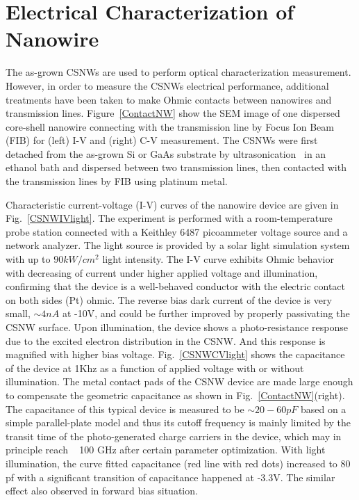 \section{Electrical Characterization of Nanowire}

The as-grown CSNWs are used to perform optical characterization measurement.
However, in order to measure the CSNWs electrical performance, additional
treatments have been taken to make Ohmic contacts between nanowires and
transmission lines. Figure~\ref{ContactNW} show the SEM image of one dispersed
core-shell nanowire connecting with the transmission line by Focus Ion Beam
(FIB) for (left) I-V and (right) C-V measurement. The CSNWs were first detached
from the as-grown Si or GaAs substrate by
ultrasonication~\cite{wang2007direct,wan2004fabrication} in an ethanol bath and
dispersed between two transmission lines, then contacted with the transmission
lines by FIB using platinum metal.

Characteristic current-voltage (I-V) curves of the nanowire device are given in
Fig.~\ref{CSNWIVlight}. The experiment is performed with a room-temperature
probe station connected with a Keithley 6487 picoammeter voltage source and a
network analyzer. The light source is provided by a solar light simulation
system with up to $90 kW/{cm}^2$ light intensity. The I-V curve exhibits Ohmic
behavior with decreasing of current under higher applied voltage and
illumination, confirming that the device is a well-behaved conductor with the
electric contact on both sides (Pt) ohmic. The reverse bias dark current of the
device is very small, $\sim4nA$ at -10V, and could be further improved by
properly passivating the CSNW surface.  Upon illumination, the device shows a
photo-resistance response due to the excited electron distribution in the CSNW.
And this response is magnified with higher bias voltage.
Fig.~\ref{CSNWCVlight} shows the capacitance of the device at 1Khz as a
function of applied voltage with or without illumination. The metal contact
pads of the CSNW device are made large enough to compensate the geometric
capacitance as shown in Fig.~\ref{ContactNW}(right).  The capacitance of this
typical device is measured to be $\sim20-60 pF$ based on a simple
parallel-plate model and thus its cutoff frequency is mainly limited by the
transit time of the photo-generated charge carriers in the device, which may in
principle reach ~ 100 GHz after certain parameter optimization. With light
illumination, the curve fitted capacitance (red line with red dots) increased
to 80 pf with a significant transition of capacitance happened at -3.3V. The
similar effect also observed in forward bias situation.

